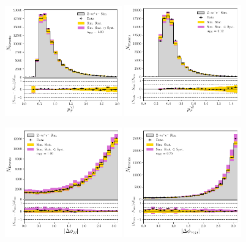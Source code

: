 \begin{figure}[h!]
    \begin{center}
        \includegraphics[width=0.45\textwidth]{figures/appendix_zee/lead_ptom_zee_PS.pdf}
        \includegraphics[width=0.45\textwidth]{figures/appendix_zee/sublead_ptom_zee_PS.pdf}
    \end{center}
    \begin{center}
        \includegraphics[width=0.45\textwidth]{figures/appendix_zee/dphi_jetjet_zee_PS.pdf}
        \includegraphics[width=0.45\textwidth]{figures/appendix_zee/dphi_gamgamjetjet_zee_PS.pdf}

\end{center}
\end{figure}

